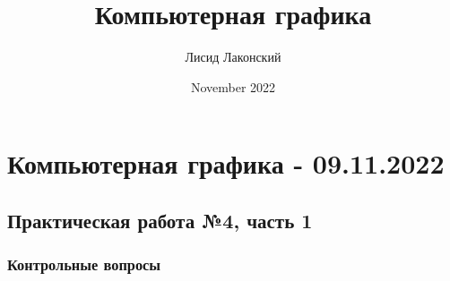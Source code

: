 \documentclass{article}
\title{Компьютерная графика}
\author{Лисид Лаконский}
\date{November 2022}
\begin{document}
\maketitle
\tableofcontents
\pagebreak

\section{Компьютерная графика - 09.11.2022}

\subsection{Практическая работа №4, часть 1}

\subsubsection{Контрольные вопросы}
\end{document}
